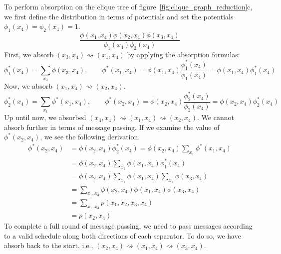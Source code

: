 \documentclass{article}
\begin{document}
To perform absorption on the clique tree of figure~\ref{fig:clique_graph_reduction}c, we first define the distribution in terms of potentials and set the potentials $\phi_1(x_4) = \phi_2(x_4) = 1$.
$$
    \frac{\phi(x_1, x_4)\phi(x_2, x_4)\phi(x_3, x_4)}{\phi_1(x_4)\phi_2(x_4)}
$$
\noindent First, we absorb $(x_3, x_4) \rightsquigarrow (x_1, x_4)$ by applying the absorption formulas:
$$
    \phi_1^*(x_4) = \sum_{x_3} \phi(x_3, x_4), \qquad \phi^*(x_1, x_4) = \phi(x_1, x_4) \frac{\phi_1^*(x_4)}{\phi_1(x_4)} = \phi(x_1, x_4)\phi_1^*(x_4)
$$
\noindent Now, we absorb $(x_1, x_4) \rightsquigarrow (x_2, x_4)$. 
$$
    \phi_2^*(x_4) = \sum_{x_1} \phi^*(x_1, x_4), \qquad \phi^*(x_2, x_4) = \phi(x_2, x_4) \frac{\phi_2^*(x_4)}{\phi_2(x_4)} = \phi(x_2, x_4)\phi_2^*(x_4)
$$
\noindent Up until now, we absorbed $(x_3, x_4) \rightsquigarrow (x_1, x_4) \rightsquigarrow (x_2, x_4)$. We cannot absorb further in terms of message passing. If we examine the value of $\phi^*(x_2, x_4)$, we see the following derivation. 
\begin{align*}
    \phi^*(x_2, x_4) &= \phi(x_2, x_4)\phi_2^*(x_4) = \phi(x_2, x_4) \sum_{x_1} \phi^*(x_1, x_4) \\
    &= \phi(x_2, x_4) \sum_{x_1} \phi(x_1, x_4)\phi_1^*(x_4) \\ 
    &= \phi(x_2, x_4) \sum_{x_1} \phi(x_1, x_4)\sum_{x_3} \phi(x_3, x_4) \\ 
    &= \sum_{x_1, x_3} \phi(x_2, x_4) \phi(x_1, x_4) \phi(x_3, x_4) \\
    &= \sum_{x_1, x_3} p(x_1, x_2, x_3, x_4) \\
    &= p(x_2, x_4)
\end{align*}
\noindent To complete a full round of message passing, we need to  pass messages according to a valid schedule along both directions of each separator. To do so, we have absorb back to the start, i.e., $(x_2, x_4) \rightsquigarrow (x_1, x_4) \rightsquigarrow (x_3, x_4)$. 
\end{document}
